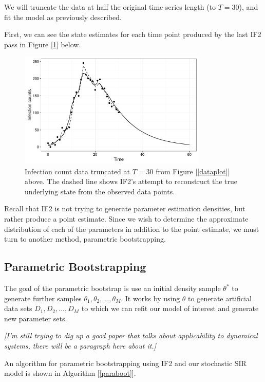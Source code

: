 \documentclass[12pt]{article}
\begin{document}
	We will truncate the data at half the original time series length (to $T = 30$), and fit the model as previously described.

	First, we can see the state estimates for each time point produced by the last IF2 pass in Figure [\ref{if2fit}] below.

	\begin{figure}[H]
        \centering
        \captionsetup{width=.8\linewidth}
        \includegraphics[width=0.8\textwidth]{./images/if2fit.pdf}
        \caption{Infection count data truncated at $T = 30$ from Figure [\ref{dataplot}] above. The dashed line shows IF2's attempt to reconstruct the true underlying state from the observed data points.}
        \label{if2fit}
    \end{figure}

    Recall that IF2 is not trying to generate parameter estimation densities, but rather produce a point estimate. Since we wish to determine the approximate distribution of each of the parameters in addition to the point estimate, we must turn to another method, parametric bootstrapping.


\subsection{Parametric Bootstrapping}

	The goal of the parametric bootstrap is use an initial density sample $\theta^*$ to generate further samples $\theta_1, \theta_2, ..., \theta_M$. It works by using $\theta$ to generate artificial data sets $D_1, D_2, ..., D_M$ to which we can refit our model of interest and generate new parameter sets.

	\textit{[I'm still trying to dig up a good paper that talks about applicability to dynamical systems, there will be a paragraph here about it.]}

	An algorithm for parametric bootstrapping using IF2 and our stochastic SIR model is shown in Algorithm [\ref{paraboot}].
\end{document}
